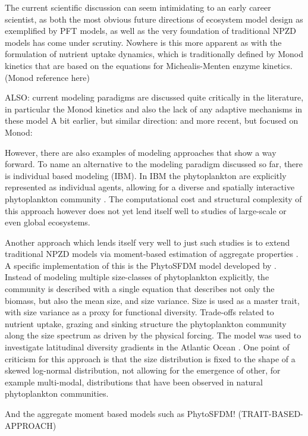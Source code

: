 The current scientific discussion can seem intimidating to an early career scientist, as both the most obvious future directions of ecosystem model design as exemplified by PFT models, as well as the very foundation of traditional NPZD models has come under scrutiny. Nowhere is this more apparent as with the formulation of nutrient uptake dynamics, which is traditionally defined by Monod kinetics that are based on the equations for Michealis-Menten enzyme kinetics. (Monod reference here)

ALSO: current modeling paradigms are discussed quite critically in the literature, in particular the Monod kinetics and also the lack of any adaptive mechanisms in these model \citep{Smith2014}
A bit earlier, but similar direction: \citep{Flynn2010}
and more recent, but focused on Monod: \citep{Hellweger2017a}

However, there are also examples of modeling approaches that show a way forward. To name an alternative to the modeling paradigm discussed so far, there is individual based modeling (IBM). In IBM the phytoplankton are explicitly represented as individual agents, allowing for a diverse and spatially interactive phytoplankton community \citep{Hellweger2009}. The computational cost and structural complexity of this approach however does not yet lend itself well to studies of large-scale or even global ecosystems. 

Another approach which lends itself very well to just such studies is to extend traditional NPZD models via moment-based estimation of aggregate properties \citep{Merico2009}. A specific implementation of this is the PhytoSFDM model developed by \citet{Acevedo-Trejos2016}. Instead of modeling multiple size-classes of phytoplankton explicitly, the community is described with a single equation that describes not only the biomass, but also the mean size, and size variance. Size is used as a master trait, with size variance as a proxy for functional diversity. Trade-offs related to nutrient uptake, grazing and sinking structure the phytoplankton community along the size spectrum as driven by the physical forcing. The model was used to investigate latitudinal diversity gradients in the Atlantic Ocean \citep{Acevedo-Trejos2018}. One point of criticism for this approach is that the size distribution is fixed to the shape of a skewed log-normal distribution, not allowing for the emergence of other, for example multi-modal, distributions that have been observed in natural phytoplankton communities. 
 
 And the aggregate moment based models such as PhytoSFDM! (TRAIT-BASED-APPROACH)

